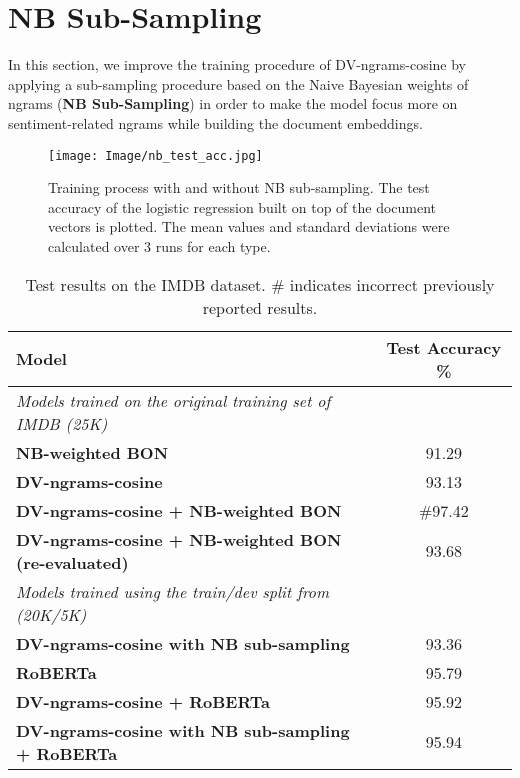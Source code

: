 \documentclass[11pt]{article}
\begin{document}
\section{NB Sub-Sampling}
\label{sec:subsamp}
In this section, we improve the training procedure of DV-ngrams-cosine by applying a sub-sampling procedure based on the Naive Bayesian weights of ngrams (\textbf{NB Sub-Sampling}) in order to make the model focus more on sentiment-related ngrams while building the document embeddings.

\begin{figure}[!htb] \centering \texttt{[image: Image/nb\_test\_acc.jpg]}
    \caption{Training process with and without NB sub-sampling. The test accuracy of the logistic regression built on top of the document vectors is plotted. The mean values and standard deviations were calculated over 3 runs for each type.}
    \label{fig:sub_samp}
\end{figure}

\begin{table*}
\centering
\begin{tabular}{lc}
\hline
\textbf{Model} & \textbf{Test Accuracy \%}\\
\hline
\textit{Models trained on the original training set of IMDB (25K)} &  \\
\textbf{NB-weighted BON} & 91.29 \\
\textbf{DV-ngrams-cosine} & 93.13 \\
\textbf{DV-ngrams-cosine + NB-weighted BON \cite{thongtan-phienthrakul-2019-sentiment}} & $\#$97.42 \\
\textbf{DV-ngrams-cosine + NB-weighted BON (re-evaluated)} & 93.68 \\
\hline
\textit{Models trained using the train/dev split from~\cite{suchin2020} (20K/5K)} & \\
\textbf{DV-ngrams-cosine with NB sub-sampling} & 93.36 \\
\textbf{RoBERTa} & 95.79 \\
\textbf{DV-ngrams-cosine + RoBERTa} & 95.92 \\
\textbf{DV-ngrams-cosine with NB sub-sampling + RoBERTa} & 95.94 \\
\hline
\end{tabular}
\caption{Test results on the IMDB dataset. $\#$ indicates incorrect previously reported results.}
\label{tab:imdb_acc}
\end{table*}
\end{document}
